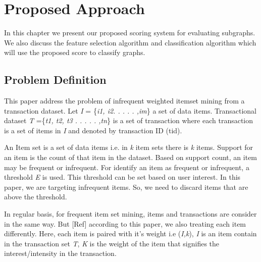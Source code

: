 \chapter{Proposed Approach} %
\label{Chapter 3}
In this chapter we present our proposed scoring system for evaluating subgraphs. We also discuss the feature selection algorithm and classification algorithm which will use the proposed score to classify graphs. 
%
%
%
\section{Problem Definition}
%
This paper address the problem of infrequent weighted itemset mining from a transaction dataset. Let {\it I} = \{{\it i1, i2. . . . . ,im}\} a set of data items. Transactional dataset {\it T} =\{{\it t1, t2, t3 . . . . . ,tn}\} is a set of transaction where each transaction is a set of items in {\it I} and denoted by transaction ID (tid). 

An Item set is a set of data items i.e. in {\it k} item sets there is {\it k} items.  Support for an item is the count of that item in the dataset. Based on support count, an item may be frequent or infrequent. For identify an item as frequent or infrequent, a threshold {\it E} is used. This threshold can be set based on user interest. In this paper, we are targeting infrequent items. So, we need to discard items that are above the threshold. 

In regular basis, for frequent item set mining, items and transactions are consider in the same way. But [Ref] according to this paper, we also treating each item differently. Here, each item is paired with it’s weight i.e ({\it I,k}), {\it I} is an item contain in the transaction set {\it T}, {\it K} is the weight of the item that signifies the interest/intensity in the transaction.

